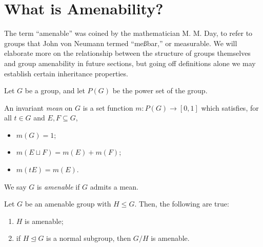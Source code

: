 \documentclass[10pt]{mypackage2}
\begin{document}
\section{What is Amenability?}\label{sec:intro_amenability}%
The term ``amenable'' was coined by the mathematician M. M. Day, to refer to groups that John von Neumann termed ``meßbar,'' or measurable. We will elaborate more on the relationship between the structure of groups themselves and group amenability in future sections, but going off definitions alone we may establish certain inheritance properties.
\begin{definition}
  Let $G$ be a group, and let $P(G)$ be the power set of the group.\newline

  An invariant \textit{mean} on $G$ is a set function $m\colon P(G)\rightarrow [0,1]$ which satisfies, for all $t\in G$ and $E,F\subseteq G$,
  \begin{itemize}
    \item $m(G) = 1$;
    \item $m\left( E\sqcup F \right) = m\left( E \right) + m\left( F \right)$;
    \item $m\left( tE \right) = m\left( E \right)$.
  \end{itemize}
  We say $G$ is \textit{amenable} if $G$ admits a mean.
\end{definition}
\begin{proposition}\label{prop:subgroups_quotientgroups_amenability}
  Let $G$ be an amenable group with $H\leq G$. Then, the following are true:
  \begin{enumerate}[(1)]
    \item $H$ is amenable;
    \item if $H\trianglelefteq G$ is a normal subgroup, then $G/H$ is amenable.
  \end{enumerate}
\end{proposition}
\end{document}
